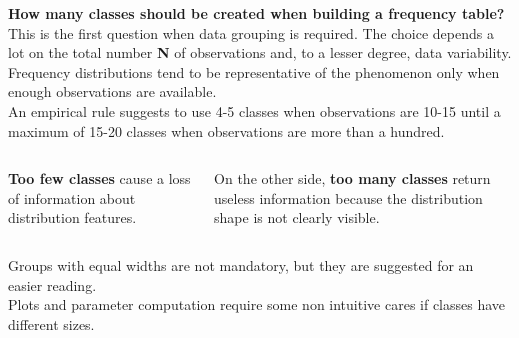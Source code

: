 \begin{frame}
  \vspace*{.5cm}
  \textbf{How many classes should be created when building a frequency table?} This is the first question when data grouping is required. The choice depends a lot on the total number \textbf{N} of observations and, to a lesser degree, data variability.\\
  \vspace*{.75cm}
  Frequency distributions tend to be representative of the phenomenon only when enough observations are available.\\
  \vspace*{.75cm}
  An empirical rule suggests to use 4-5 classes when observations are 10-15 until a maximum of 15-20 classes when observations are more than a hundred.\\
\end{frame}

\begin{frame}
  \begin{columns}
    \begin{column}{6cm}
      \textbf{Too few classes} cause a loss of information about distribution features. \\
    \end{column}
    \begin{column}{6cm}
      On the other side, \textbf{too many classes} return useless information because the distribution shape is not clearly visible.\\
    \end{column}
  \end{columns}
  \vspace{1.5cm}
  Groups with equal widths are not mandatory, but they are suggested for an easier reading. \\
  Plots and parameter computation require some non intuitive cares if classes have different sizes. \\
\end{frame}

